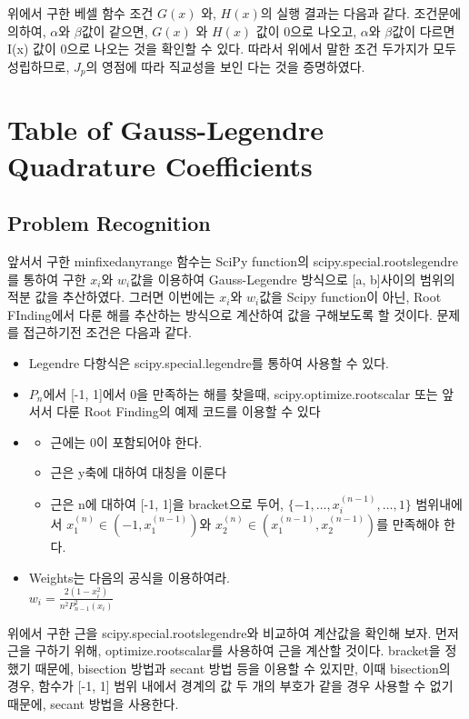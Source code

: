 \documentclass[11pt]{article}
\begin{document}
위에서 구한 베셀 함수 조건 $G(x)$ 와, $H(x)$의 실행 결과는 다음과 같다.  조건문에 의하여, $\alpha$와  $\beta$값이 같으면, $G(x)$ 와 $H(x)$ 값이 0으로 나오고,  $\alpha$와  $\beta$값이 다르면 I(x) 값이 0으로 나오는 것을 확인할 수 있다. 따라서 위에서 말한 조건 두가지가 모두 성립하므로, $J_p$의 영점에 따라 직교성을 보인 다는 것을 증명하였다. 
\pagebreak























\section{Table of Gauss-Legendre Quadrature Coefficients}
\subsection{Problem Recognition} 
앞서서 구한 min\textunderscore fixed\textunderscore any\textunderscore range 함수는 SciPy function의 scipy.special.roots\textunderscore legendre를 통하여 구한 $x_i$와 $w_i$값을 이용하여 Gauss-Legendre 방식으로 [a, b]사이의 범위의 적분 값을 추산하였다. 그러면 이번에는 $x_i$와 $w_i$값을 Scipy function이 아닌, Root FInding에서 다룬 해를 추산하는 방식으로 계산하여 값을 구해보도록 할 것이다. 문제를 접근하기전 조건은 다음과 같다.

\begin{itemize}
\item Legendre 다항식은 scipy.special.legendre를 통하여 사용할 수 있다.
\item $P_n$에서 [-1, 1]에서 0을 만족하는 해를 찾을때, scipy.optimize.root\textunderscore scalar 또는 앞서서 다룬 Root Finding의 예제 코드를 이용할 수 있다
\item 
\begin{itemize}
\item 근에는 0이 포함되어야 한다.
\item 근은 y축에 대하여 대칭을 이룬다
\item 근은 n에 대하여 [-1, 1]을 bracket으로 두어, $\{-1, \dots, x_i^{(n-1)}, \dots, 1\}$ 범위내에서
$x_1^{(n)} \in (-1, x_1^{(n-1)})$와 $x_2^{(n)} \in (x_1^{(n-1)}, x_2^{(n-1)})$를 만족해야 한다.

\end{itemize}
\item Weights는 다음의 공식을 이용하여라. \\$w_i = \frac{2(1 - x_i^2)}{n^2 P_{n - 1}^2(x_i)}$
\end{itemize}
위에서 구한 근을 scipy.special.roots\textunderscore legendre와 비교하여 계산값을 확인해 보자.
먼저 근을 구하기 위해, optimize.root\textunderscore scalar를 사용하여 근을 계산할 것이다. bracket을 정했기 때문에, bisection 방법과 secant 방법 등을 이용할 수 있지만, 이때 bisection의 경우, 함수가 [-1, 1] 범위 내에서 경계의 값 두 개의 부호가 같을 경우 사용할 수 없기 때문에, secant 방법을 사용한다. 
\end{document}

